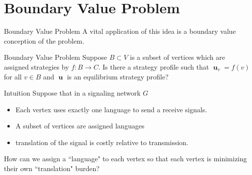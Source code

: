 \documentclass{beamer}
\DeclareMathOperator{\uu}{\mathbf{u}}
\begin{document}
\section{Boundary Value Problem}
\begin{frame}{Boundary Value Problem}
	A vital application of this idea is a boundary value conception of the problem.
	\begin{block}{Boundary Value Problem}
		Suppose $B\subset V$ is a subset of vertices which are assigned strategies by $f:B\rightarrow C$. Is there a strategy profile such that $\uu_v=f(v)$ for all $v\in B$ and $\uu$ is an equilibrium strategy profile?
	\end{block}
\end{frame}
\begin{frame}{Intuition}
	Suppose that in  a signaling network $G$
	\begin{itemize}
		\item Each vertex uses exactly one language to send a receive signals. 
		\item A subset of vertices are assigned languages
		\item translation of the signal is costly relative to transmission. 
	\end{itemize}

	How can we assign a ``language" to each vertex so that each vertex is minimizing their own ``translation" burden?
\end{frame}
\end{document}

